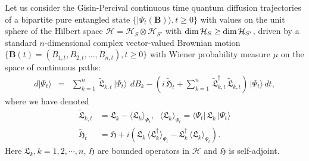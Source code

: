Let us consider  the Gisin-Percival continuous time quantum diffusion trajectories of a bipartite pure entangled state  
$\{\vert\Psi_t(\mathbf{B})\rangle, t\geq 0\}$ with values on the unit sphere of the  Hilbert space  $\mathcal{H}=\mathcal{H}_{S}\otimes \mathcal{H}_{S'}$  with  ${\rm dim}\,{\mathcal{H}_S}\geq {\rm dim}\,{\mathcal{H}_{S'}}$, driven by a standard $n$-dimensional complex vector-valued  Brownian motion $\{\mathbf{B}(t)=(B_{1,t},B_{2,t},\ldots , B_{n,t}), t\geq 0\}$  with Wiener probability measure $\mu$ on the space of continuous paths:
\begin{eqnarray}
d\vert\Psi_t\rangle &=& \sum_{k=1}^n\, \widetilde{\mathfrak{L}}_{k,t}\, \vert\Psi_t\rangle\, \  dB_{k} 
-\left(i\, \widetilde{\mathfrak{H}}_t + \sum_{k=1}^{n}\,  \widetilde{\mathfrak{L}}_{k,t}^\dag\, \widetilde{\mathfrak{L}}_{k,t}\right)\, \vert \Psi_t\rangle\, dt,   \label{chap5-eq7.1}
\end{eqnarray}
where we have denoted 
\begin{align}
		\widetilde{\mathfrak{L}}_{k,t}&=\mathfrak{L}_k-\langle \mathfrak{L}_k \rangle_{\Psi_t},\, \ \ 
		\langle \mathfrak{L}_k \rangle_{\Psi_t}=\langle \Psi_t\vert\, \mathfrak{L}_k\,\vert \Psi_t\rangle  \nonumber \\ 
		\widetilde{\mathfrak{H}}_t&= \mathfrak{H}+i\left(\mathfrak{L}_k\, \langle \mathfrak{L}^\dag_k\rangle_{\Psi_t}-\mathfrak{L}^\dag_k\, \langle \mathfrak{L}_k\rangle_{\Psi_t} \right).   \label{chap5-eq7.2}
\end{align}
Here $\mathfrak{L}_k, k=1,2,\cdots, n$, $\mathfrak{H}$ are bounded operators in  $\mathcal{H}$ and $\mathfrak{H}$ is self-adjoint. 

